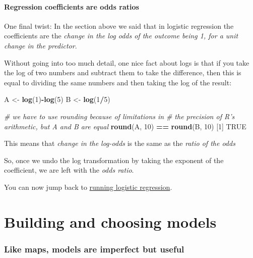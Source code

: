\documentclass[]{article}
\newenvironment{Shaded}{\begin{snugshade}}{\end{snugshade}}
\newcommand{\CommentTok}[1]{\textcolor[rgb]{0.56,0.35,0.01}{\textit{#1}}}
\newcommand{\DecValTok}[1]{\textcolor[rgb]{0.00,0.00,0.81}{#1}}
\newcommand{\KeywordTok}[1]{\textcolor[rgb]{0.13,0.29,0.53}{\textbf{#1}}}
\newcommand{\NormalTok}[1]{#1}
\newcommand{\OperatorTok}[1]{\textcolor[rgb]{0.81,0.36,0.00}{\textbf{#1}}}
\newcommand{\OtherTok}[1]{\textcolor[rgb]{0.56,0.35,0.01}{#1}}
\newcommand{\StringTok}[1]{\textcolor[rgb]{0.31,0.60,0.02}{#1}}
\let\oldparagraph\paragraph
\renewcommand{\paragraph}[1]{\oldparagraph{#1}\mbox{}}
\begin{document}
\hypertarget{regression-coefficients-are-odds-ratios}{%
\paragraph{Regression coefficients are odds ratios}\label{regression-coefficients-are-odds-ratios}}

One final twist: In the section above we said that in logistic regression the
coefficients are the \emph{change in the log odds of the outcome being 1, for a unit
change in the predictor}.

Without going into too much detail, one nice fact about logs is that if you take
the log of two numbers and subtract them to take the difference, then this is
equal to dividing the same numbers and then taking the log of the result:

\begin{Shaded}
\begin{Highlighting}[]
\NormalTok{A <-}\StringTok{ }\KeywordTok{log}\NormalTok{(}\DecValTok{1}\NormalTok{)}\OperatorTok{-}\KeywordTok{log}\NormalTok{(}\DecValTok{5}\NormalTok{)}
\NormalTok{B  <-}\StringTok{ }\KeywordTok{log}\NormalTok{(}\DecValTok{1}\OperatorTok{/}\DecValTok{5}\NormalTok{)}


\CommentTok{# we have to use rounding because of limitations in}
\CommentTok{# the precision of R's arithmetic, but A and B are equal}
\KeywordTok{round}\NormalTok{(A, }\DecValTok{10}\NormalTok{) }\OperatorTok{==}\StringTok{ }\KeywordTok{round}\NormalTok{(B, }\DecValTok{10}\NormalTok{)}
\NormalTok{[}\DecValTok{1}\NormalTok{] }\OtherTok{TRUE}
\end{Highlighting}
\end{Shaded}

This means that \emph{change in the log-odds} is the same as the \emph{ratio of the odds}

So, once we undo the log transformation by taking the exponent of the
coefficient, we are left with the \emph{odds ratio}.

You can now jump back to \protect\hyperlink{logistic-regression}{running logistic regression}.

\hypertarget{comparison-and-selection}{%
\section{Building and choosing models}\label{comparison-and-selection}}

\hypertarget{like-maps-models-are-imperfect-but-useful}{%
\subsubsection*{Like maps, models are imperfect but useful}\label{like-maps-models-are-imperfect-but-useful}}
\end{document}
